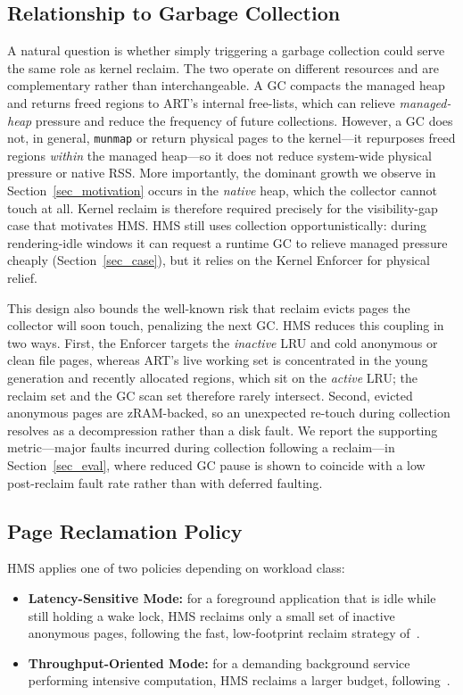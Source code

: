 \subsection{Relationship to Garbage Collection}
\label{subsec_gc_relation}
A natural question is whether simply triggering a garbage collection could serve the same role as kernel reclaim. The two operate on different resources and are complementary rather than interchangeable. A GC compacts the managed heap and returns freed regions to ART's internal free-lists, which can relieve \emph{managed-heap} pressure and reduce the frequency of future collections. However, a GC does not, in general, \texttt{munmap} or return physical pages to the kernel---it repurposes freed regions \emph{within} the managed heap---so it does not reduce system-wide physical pressure or native RSS. More importantly, the dominant growth we observe in Section~\ref{sec_motivation} occurs in the \emph{native} heap, which the collector cannot touch at all. Kernel reclaim is therefore required precisely for the visibility-gap case that motivates HMS. HMS still uses collection opportunistically: during rendering-idle windows it can request a runtime GC to relieve managed pressure cheaply (Section~\ref{sec_case}), but it relies on the Kernel Enforcer for physical relief.

This design also bounds the well-known risk that reclaim evicts pages the collector will soon touch, penalizing the next GC. HMS reduces this coupling in two ways. First, the Enforcer targets the \emph{inactive} LRU and cold anonymous or clean file pages, whereas ART's live working set is concentrated in the young generation and recently allocated regions, which sit on the \emph{active} LRU; the reclaim set and the GC scan set therefore rarely intersect. Second, evicted anonymous pages are zRAM-backed, so an unexpected re-touch during collection resolves as a decompression rather than a disk fault. We report the supporting metric---major faults incurred during collection following a reclaim---in Section~\ref{sec_eval}, where reduced GC pause is shown to coincide with a low post-reclaim fault rate rather than with deferred faulting.

\subsection{Page Reclamation Policy}
HMS applies one of two policies depending on workload class:
\begin{itemize}
  \item \textbf{Latency-Sensitive Mode:} for a foreground application that is idle while still holding a wake lock, HMS reclaims only a small set of inactive anonymous pages, following the fast, low-footprint reclaim strategy of~\cite{TCE_Lim2013_VMP}.
  \item \textbf{Throughput-Oriented Mode:} for a demanding background service performing intensive computation, HMS reclaims a larger budget, following~\cite{TCE_Hwang2012_CompressedSwap}.
\end{itemize}

